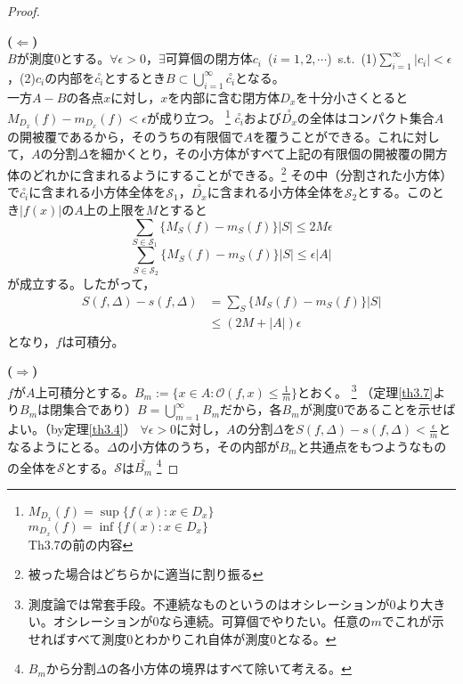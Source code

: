 \begin{proof}\
	\par\noindent\textbf{($\Leftarrow$)}\\
	$B$が測度$0$とする。$\forall\epsilon>0$，$\exists$可算個の閉方体$c_i$\ ($i=1,2,\cdots$)\ s.t.\ (1)$\sum_{i=1}^\infty|c_i|<\epsilon$，(2)$c_i$の内部を$\overset{\circ}{c_i}$とするとき$B\subset\bigcup_{i=1}^\infty \overset{\circ}{c_i}$となる。\\
	一方$A-B$の各点$x$に対し，$x$を内部に含む閉方体$D_x$を十分小さくとると$M_{D_x}(f)-m_{D_x}(f)<\epsilon$が成り立つ。
    \footnote{
    $M_{D_x}(f)=\sup\{f(x):x\in D_x\}$\\
    $m_{D_x}(f)=\inf\{f(x):x\in D_x\}$\\
    Th3.7の前の内容
    }
	$\overset{\circ}{c_i}$および$\overset{\circ}{D_x}$の全体はコンパクト集合$A$の開被覆であるから，そのうちの有限個で$A$を覆うことができる。これに対して，$A$の分割$\Delta$を細かくとり，その小方体がすべて上記の有限個の開被覆の開方体のどれかに含まれるようにすることができる。\footnote{
    被った場合はどちらかに適当に割り振る
    }
	その中（分割された小方体）で$\overset{\circ}{c_i}$に含まれる小方体全体を$\mathscr{S}_1$，$\overset{\circ}{D_{x}}$に含まれる小方体全体を$\mathscr{S}_2$とする。このとき$|f(x)|$の$A$上の上限を$M$とすると
	\[
		\sum_{S\in\mathscr{S}_1}\{M_S(f)-m_S(f)\}|S|\leq 2M\epsilon
	\]
	\[
		\sum_{S\in\mathscr{S}_2}\{M_S(f)-m_S(f)\}|S|\leq \epsilon|A|
	\]
	が成立する。したがって，
	\[
	\begin{split}
	S(f,\Delta)-s(f,\Delta)&=\sum_{S}\{M_S(f)-m_S(f)\}|S| \\
	&\leq (2M+|A|)\epsilon
	\end{split}
	\]
	となり，$f$は可積分。
	\par\noindent\textbf{($\Rightarrow$)}\\
	$f$が$A$上可積分とする。$\displaystyle B_m:=\{x\in A:\mathscr{O}(f,x)\leq\frac{1}{m}\}$とおく。
    \footnote{
    測度論では常套手段。不連続なものというのはオシレーションが0より大きい。オシレーションが0なら連続。可算個でやりたい。任意の$m$でこれが示せればすべて測度0とわかりこれ自体が測度0となる。
    }
	（定理\ref{th3.7}より$B_m$は閉集合であり）$\displaystyle B=\bigcup_{m=1}^\infty B_m$だから，各$B_m$が測度0であることを示せばよい。（by定理\ref{th3.4}）
	$\forall\epsilon>0$に対し，$A$の分割$\Delta$を$\displaystyle S(f,\Delta)-s(f,\Delta)<\frac{\epsilon}{m}$となるようにとる。$\Delta$の小方体のうち，その内部が$B_m$と共通点をもつようなものの全体を$\mathscr{S}$とする。$\mathscr{S}$は$\overset{\circ}{B_m}$
    \footnote{
    $B_m$から分割$\Delta$の各小方体の境界はすべて除いて考える。
}
\end{proof}
